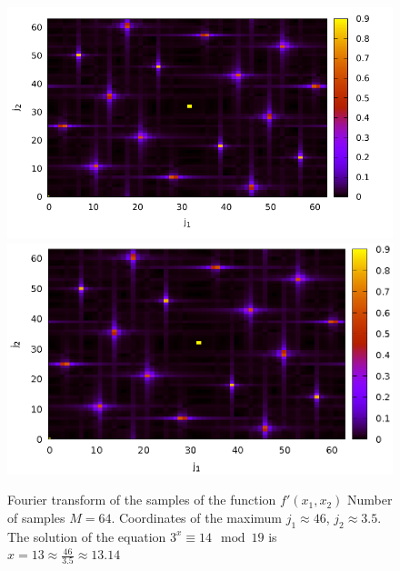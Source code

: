 \begin{figure}
\centering

\ifpdf
\includegraphics[angle=0]
{./discretlog/picdiscretlog3.pdf}
\else
\includegraphics[angle=0]
{./discretlog/picdiscretlog3.eps}
\fi

%

\caption{Fourier transform of the samples of the function 
$f'(x_1, x_2)$
Number of samples $M=64$. Coordinates of the maximum $j_1 \approx 46$, $j_2 \approx 3.5$. 
The solution of the equation $3^x \equiv 14 \mod 19$
is $x = 13 \approx \frac{46}{3.5} \approx 13.14$
} 
\label{fig:dl3}
\end{figure}
